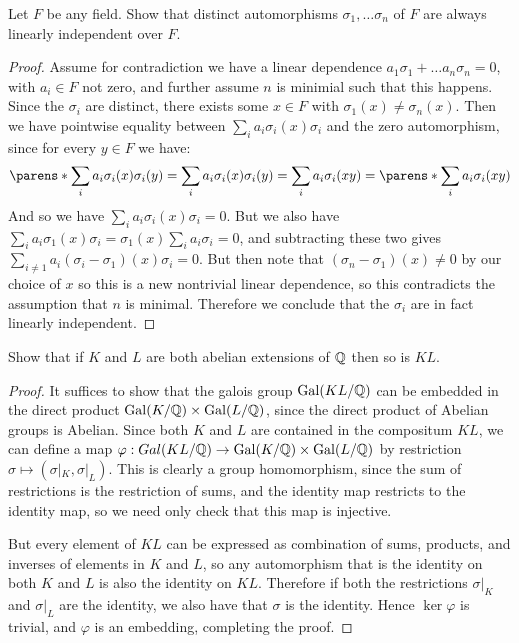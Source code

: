 \documentclass[11pt]{article}
\DeclareMathOperator{\Gal}{Gal}
\begin{document}
Let $F$ be any field. Show that distinct automorphisms $\sigma_1, \dots \sigma_n$ of $F$ are always linearly independent over $F$.

\begin{proof}
  Assume for contradiction we have a linear dependence $a_1\sigma_1 + \dots a_n\sigma_n = 0$, with $a_i \in F$ not zero, and further assume $n$ is minimial such that this happens.
  Since the $\sigma_i$ are distinct, there exists some $x \in F$ with $\sigma_1(x) \ne \sigma_n(x)$.
  Then we have pointwise equality between $\sum_i a_i \sigma_i(x) \sigma_i$ and the zero automorphism, since for every $y \in F$ we have:
  \begin{equation*}
    \parens*{\sum_i a_i \sigma_i(x) \sigma_i}(y)
    = \sum_i a_i \sigma_i(x) \sigma_i(y)
    = \sum_i a_i \sigma_i(xy)
    = \parens*{\sum_i a_i \sigma_i}(xy)
  \end{equation*}
  And so we have $\sum_i a_i \sigma_i(x) \sigma_i = 0$.
  But we also have $\sum_i a_i \sigma_1(x) \sigma_i = \sigma_1(x) \sum_i a_i \sigma_i = 0$, and subtracting these two gives $\sum_{i \ne 1} a_i (\sigma_i - \sigma_1)(x) \sigma_i = 0$.
  But then note that $(\sigma_n - \sigma_1)(x) \ne 0$ by our choice of $x$ so this is a new nontrivial linear dependence, so this contradicts the assumption that $n$ is minimal.
  Therefore we conclude that the $\sigma_i$ are in fact linearly independent.
\end{proof}


Show that if $K$ and $L$ are both abelian extensions of $\mathbb{Q}$ then so is $KL$.

\begin{proof}
  It suffices to show that the galois group $\Gal(KL/\Q)$ can be embedded in the direct product $\Gal(K/\Q) \times \Gal(L/\Q)$, since the direct product of Abelian groups is Abelian.
  Since both $K$ and $L$ are contained in the compositum $KL$, we can define a map $\varphi : Gal(KL/\Q) \rightarrow \Gal(K/\Q) \times \Gal(L/\Q)$ by restriction $\sigma \mapsto (\sigma|_K, \sigma|_L)$.
  This is clearly a group homomorphism, since the sum of restrictions is the restriction of sums, and the identity map restricts to the identity map, so we need only check that this map is injective.

  But every element of $KL$ can be expressed as combination of sums, products, and inverses of elements in $K$ and $L$, so any automorphism that is the identity on both $K$ and $L$ is also the identity on $KL$.
  Therefore if both the restrictions $\sigma|_K$ and $\sigma|_L$ are the identity, we also have that $\sigma$ is the identity.
  Hence $\ker \varphi$ is trivial, and $\varphi$ is an embedding, completing the proof.
\end{proof}
\end{document}

